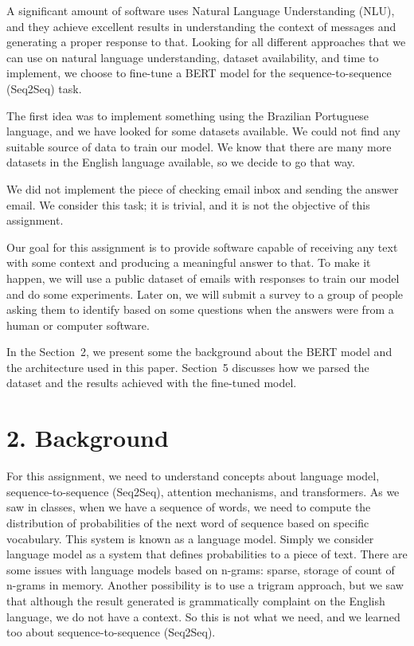 \documentclass[letterpaper]{article}
\begin{document}
A significant amount of software uses Natural Language Understanding (NLU), and they achieve excellent results in understanding the context of messages and generating a proper response to that. Looking for all different approaches that we can use on natural language understanding, dataset availability, and time to implement, we choose to fine-tune a BERT model for the sequence-to-sequence (Seq2Seq) task.

The first idea was to implement something using the Brazilian Portuguese language, and we have looked for some datasets available. We could not find any suitable source of data to train our model. We know that there are many more datasets in the English language available, so we decide to go that way.

We did not implement the piece of checking email inbox and sending the answer email. We consider this task; it is trivial, and it is not the objective of this assignment.

Our goal for this assignment is to provide software capable of receiving any text with some context and producing a meaningful answer to that. To make it happen, we will use a public dataset of emails with responses to train our model and do some experiments. Later on, we will submit a survey to a group of people asking them to identify based on some questions when the answers were from a human or computer software.

In the Section~2, we present some the background about the BERT model and the architecture used in this paper. Section~5 discusses how we parsed the dataset and the results achieved with the fine-tuned model.


\section{2. Background}

For this assignment, we need to understand concepts about language model, sequence-to-sequence (Seq2Seq), attention mechanisms, and transformers. As we saw in classes, when we have a sequence of words, we need to compute the distribution of probabilities of the next word of sequence based on specific vocabulary. This system is known as a language model. Simply we consider language model as a system that defines probabilities to a piece of text. There are some issues with language models based on n-grams: sparse, storage of count of n-grams in memory. Another possibility is to use a trigram approach, but we saw that although the result generated is grammatically complaint on the English language, we do not have a context. So this is not what we need, and we learned too about sequence-to-sequence (Seq2Seq).
\end{document}
